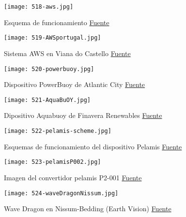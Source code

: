\begin{figure}
\centering
\texttt{[image: 518-aws.jpg]}
\caption[Esquema de funcionamiento]{Esquema de funcionamiento \href{www.awsocean.com}{Fuente}}
\label{fig:aws}
\end{figure}

\begin{figure}
\centering
\texttt{[image: 519-AWSportugal.jpg]}
\caption[Sistema AWS en Viana do Castello]{Sistema AWS en Viana do Castello \href{www.awsocean.com}{Fuente}}
\label{fig:AWSportugal}
\end{figure}

\begin{figure}
\centering
\texttt{[image: 520-powerbuoy.jpg]}
\caption[Dispositivo PowerBuoy de Atlantic City]{Dispositivo PowerBuoy de Atlantic City \href{www.oceanpowertechnologies.com}{Fuente}}
\label{fig:powerbuoy}
\end{figure}

\begin{figure}
\centering
\texttt{[image: 521-AquaBuOY.jpg]}
\caption[Dipositivo Aquabuoy de Finavera Renewables]{Dipositivo Aquabuoy de Finavera Renewables \href{http://www.global-greenhouse-warming.com/Finavera-aquabuoy.html}{Fuente}}
\label{fig:AquaBuOY}
\end{figure}

\begin{figure}
\centering
\texttt{[image: 522-pelamis-scheme.jpg]}
\caption[Esquemas de funcionamiento del dispositivo Pelamis]{Esquemas de funcionamiento del dispositivo Pelamis \href{http://www.eve.eus/La-energia/Infografias/La-energia-del-mar/La-energia-del-mar.aspx?lang=es-ES}{Fuente}}
\label{fig:pelamis-scheme}
\end{figure}

\begin{figure}
\centering
\texttt{[image: 523-pelamisP002.jpg]}
\caption[Imagen del convertidor pelamis P2-001]{Imagen del convertidor pelamis P2-001 \href{http://www.emec.org.uk/about-us/wave-clients/pelamis-wave-power/}{Fuente}}
\label{fig:pelamisP002}
\end{figure}

\begin{figure}
\centering
\texttt{[image: 524-waveDragonNissum.jpg]}
\caption[Wave Dragon en Nissum-Bedding]{Wave Dragon en Nissum-Bedding (Earth Vision) \href{http://www.wavedragon.net/prototype-testing-in-denmark/}{Fuente}}
\label{fig:waveDragonNissum}
\end{figure}

